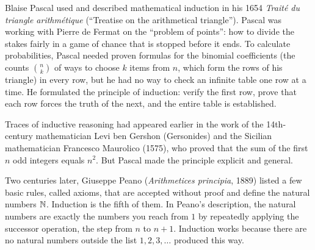 \begin{historybox}
Blaise Pascal used and described mathematical induction in his 1654 \emph{Trait\'e du triangle arithm\'etique} (``Treatise on the arithmetical triangle''). Pascal was working with Pierre de Fermat on the ``problem of points'': how to divide the stakes fairly in a game of chance that is stopped before it ends. To calculate probabilities, Pascal needed proven formulas for the binomial coefficients (the counts $\binom{n}{k}$ of ways to choose $k$ items from $n$, which form the rows of his triangle) in every row, but he had no way to check an infinite table one row at a time. He formulated the principle of induction: verify the first row, prove that each row forces the truth of the next, and the entire table is established.

Traces of inductive reasoning had appeared earlier in the work of the 14th-century mathematician Levi ben Gershon (Gersonides) and the Sicilian mathematician Francesco Maurolico (1575), who proved that the sum of the first $n$ odd integers equals $n^2$. But Pascal made the principle explicit and general. 

Two centuries later, Giuseppe Peano (\emph{Arithmetices principia}, 1889) listed a few basic rules, called axioms, that are accepted without proof and define the natural numbers $\mathbb{N}$. Induction is the fifth of them. In Peano's description, the natural numbers are exactly the numbers you reach from $1$ by repeatedly applying the successor operation, the step from $n$ to $n+1$. Induction works because there are no natural numbers outside the list $1, 2, 3, \dots$ produced this way.
\end{historybox}


